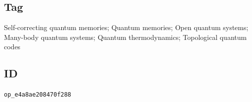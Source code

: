 \subsection*{Tag}

Self-correcting quantum memories; Quantum memories; Open quantum systems;
Many-body quantum systems; Quantum thermodynamics; Topological quantum codes

\subsection*{ID}

\texttt{op\_e4a8ae208470f288}
